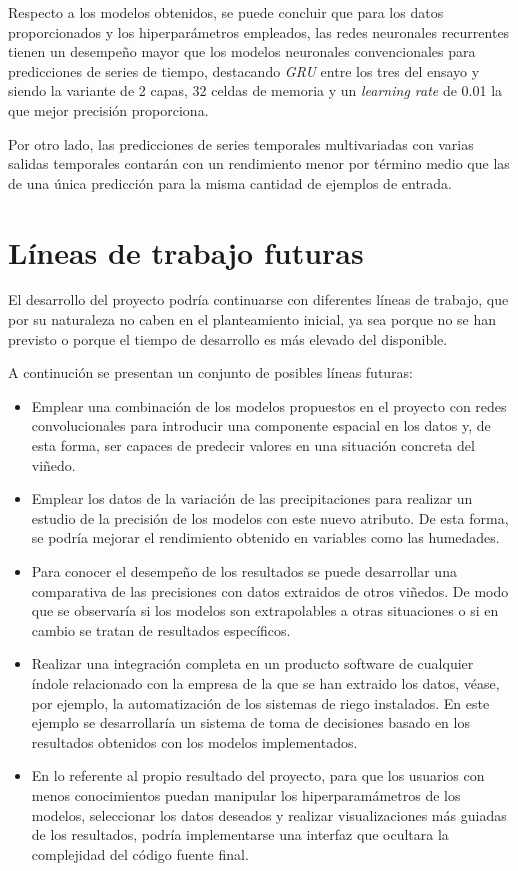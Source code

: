 Respecto a los modelos obtenidos, se puede concluir que para los datos proporcionados y los hiperparámetros
empleados, las redes neuronales recurrentes tienen un desempeño mayor que los modelos neuronales
convencionales para predicciones de series de tiempo, destacando \textit{GRU}
entre los tres del ensayo y siendo la variante de 2 capas, 32 celdas de memoria y un \textit{learning rate}
de 0.01 la que mejor precisión proporciona.

Por otro lado, las predicciones de series temporales multivariadas con varias salidas temporales contarán
con un rendimiento menor por término medio que las de una única predicción para la misma cantidad
de ejemplos de entrada.

\section{Líneas de trabajo futuras}
El desarrollo del proyecto podría continuarse con diferentes líneas de trabajo, que por su naturaleza
no caben en el planteamiento inicial, ya sea porque no se han previsto o porque el tiempo
de desarrollo es más elevado del disponible.

A continución se presentan un conjunto de posibles líneas futuras:
\begin{itemize}
    \item Emplear una combinación de los modelos propuestos en el proyecto con redes convolucionales
        para introducir una componente espacial en los datos y, de esta forma, ser capaces de predecir valores
        en una situación concreta del viñedo.
    \item Emplear los datos de la variación de las precipitaciones para realizar un estudio de la precisión
        de los modelos con este nuevo atributo. De esta forma, se podría mejorar el rendimiento obtenido
        en variables como las humedades. 
    \item Para conocer el desempeño de los resultados se puede desarrollar una comparativa de las precisiones
        con datos extraidos de otros viñedos. De modo que se observaría si los modelos son extrapolables
        a otras situaciones o si en cambio se tratan de resultados específicos.
    \item Realizar una integración completa en un producto software de cualquier índole relacionado con
        la empresa de la que se han extraido los datos, véase, por ejemplo, la automatización de los sistemas de riego
        instalados. En este ejemplo se desarrollaría un sistema de toma de decisiones basado en los resultados obtenidos
        con los modelos implementados.
    \item En lo referente al propio resultado del proyecto, para que los usuarios con menos conocimientos puedan manipular los
        hiperparamámetros de los modelos, seleccionar los datos deseados y realizar visualizaciones más guiadas de los resultados, 
        podría implementarse una interfaz que ocultara la complejidad del código fuente final.
\end{itemize}